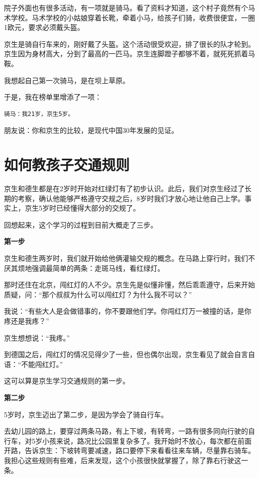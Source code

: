 \documentclass[twoside,openright,headings=optiontohead]{ctexbook} %
\begin{document}
{院子外面也有很多活动，有一项就是骑马。看了资料才知道，这个村子竟然有个马术学校。马术学校的小姑娘穿着长靴，牵着小马，给孩子们骑，收费很便宜，一圈1欧元，要求必须戴头盔。

京生是骑自行车来的，刚好戴了头盔。这个活动很受欢迎，排了很长的队才轮到。京生因为身材高大，分到了最高的一匹马。京生连脚蹬子都够不着，就死死抓着马鞍。

我想起自己第一次骑马，是在坝上草原。

于是，我在榜单里增添了一项：

\begin{verbatim}
骑马：我21岁，京生5岁。
\end{verbatim}

朋友说：你和京生的比较，是现代中国30年发展的见证。

\chapter*{如何教孩子交通规则}\label{traffic-rules}

京生和德生都是在2岁时开始对红绿灯有了初步认识。此后，我们对京生经过了长期的考察，确认他能够严格遵守交规之后，8岁时我们才放心地让他自己上学。事实上，京生5岁时已经懂得大部分的交规了。

回想起来，这个学习的过程到目前大概走了三步。

\textbf{第一步}

京生和德生两岁时，我们就开始给他俩灌输交规的概念。在马路上穿行时，我们不厌其烦地强调最简单的两条：走斑马线，看红绿灯。

那时还住在北京，闯红灯的人不少。京生先是似懂非懂，然后乖乖遵守，后来开始质疑，问：``那个叔叔为什么可以闯红灯？为什么我不可以？''

我说：``有些大人是会做错事的，你不要跟他们学。你闯红灯万一被撞的话，是你疼还是我疼？''

京生想想说：``我疼。''

到德国之后，闯红灯的情况见得少了一些，但也偶尔出现，京生看见了就会自言自语：``不能闯红灯。''

这可以算是京生学习交通规则的第一步。

\textbf{第二步}

5岁时，京生迈出了第二步，是因为学会了骑自行车。

去幼儿园的路上，要穿过两条马路，有上下坡，有转弯，一路有很多同向行驶的自行车，对5岁小孩来说，路况比公园里复杂多了。我开始时不放心，每次都在前面开路，告诉京生：下坡转弯要减速，路口要停下来看看往来车辆，尽量靠右骑车。我担心这些规则有些难，后来发现，这个小孩很快就掌握了，除了靠右行驶这一条。

}
\end{document}
